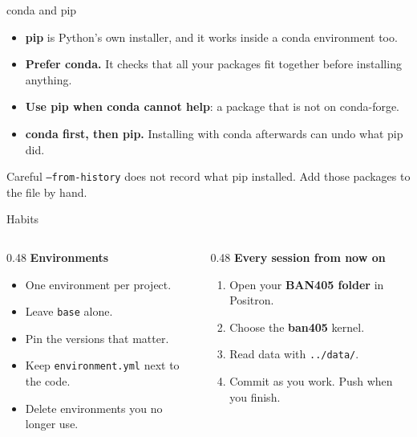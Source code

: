 \documentclass[aspectratio=169,11pt]{beamer}
\newcommand{\code}[1]{\texttt{#1}}
\newcommand{\key}[1]{\textbf{\textcolor{ban}{#1}}}
\begin{document}
\begin{frame}{conda and pip}
  \begin{itemize}
    \item \key{pip} is Python's own installer, and it works inside a conda environment too.
    \item \textbf{Prefer conda.} It checks that all your packages fit together before installing anything.
    \item \textbf{Use pip when conda cannot help}: a package that is not on conda-forge.
    \item \textbf{conda first, then pip.} Installing with conda afterwards can undo what pip did.
  \end{itemize}
  \vspace{0.8em}
  \begin{block}{Careful}
    \code{--from-history} does not record what pip installed. Add those packages to the file by hand.
  \end{block}
\end{frame}

\begin{frame}{Habits}
  \begin{columns}[T]
    \begin{column}{0.48\textwidth}
      \textbf{Environments}
      \begin{itemize}
        \item One environment per project.
        \item Leave \code{base} alone.
        \item Pin the versions that matter.
        \item Keep \code{environment.yml} next to the code.
        \item Delete environments you no longer use.
      \end{itemize}
    \end{column}
    \begin{column}{0.48\textwidth}
      \textbf{Every session from now on}
      \begin{enumerate}
        \item Open your \textbf{BAN405 folder} in Positron.
        \item Choose the \key{ban405} kernel.
        \item Read data with \code{../data/}.
        \item Commit as you work. Push when you finish.
      \end{enumerate}
    \end{column}
  \end{columns}
\end{frame}
\end{document}
